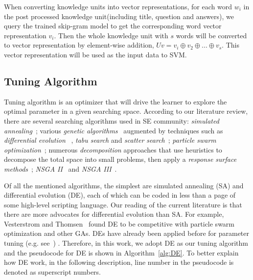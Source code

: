 When converting knowledge units into vector representations, 
for each word $w_i$ in the post processed knowledge unit(including title, question and answers),
we query the trained skip-gram model to get the corresponding word vector representation $v_i$.
Then the whole knowledge unit with $s$ words
will be converted to vector representation by element-wise addition, $Uv = v_i \oplus v_2 \oplus...\oplus v_s $. 
This vector representation will be used
as the input data to SVM.




\subsection{Tuning Algorithm}

Tuning algorithm is an optimizer that will drive the learner to explore
the optimal parameter in a given searching space. According to our
literature review, there are several searching algorithms used in 
SE community:{\em 
simulated annealing}~\cite{feather2002converging,menzies2007data};
 various {\em genetic algorithms}~\cite{jones1996automatic,harman2007current, arcuri2011parameter} augmented by
techniques such as {\em differential evolution}
~\cite{storn1997differential, fu2016tuning, fu2016differential,chaves2015differential,agrawal2016wrong}, 
{\em tabu search} and {\em scatter search}~\cite{beausoleil2006moss,molina2007sspmo,corazza2013using};
{\em particle swarm optimization}~\cite{windisch2007applying}; 
numerous {\em decomposition} approaches that use
    heuristics to decompose the total space into   small problems,   then apply a
    {\em response surface methods}~\cite{krall2015gale};
     {\em NSGA II} ~\cite{zhang2007multi}and {\em NSGA III}~\cite{mkaouer2014high}.


Of all the mentioned algorithms,  the simplest are simulated annealing (SA)  and 
differential evolution (DE), each of which can be coded in less than a page of some high-level scripting language.
 Our reading of the current literature is that there are more  advocates for
differential evolution than SA. For example,  Vesterstrom and Thomsen~\cite{Vesterstrom04} found DE to be competitive with 
 particle swarm optimization and other GAs.  DEs have already been applied before for 
 parameter tuning (e.g. see~\cite{omran2005differential, chiha2012tuning, fu2016tuning, fu2016differential, agrawal2016wrong}) .
Therefore, in this work, we adopt DE as our tuning algorithm and 
the pseudocode for DE is shown in Algorithm~\ref{alg:DE}.
To better explain how DE work, in the following description, 
line number in the pseudocode is denoted as superscript numbers.

